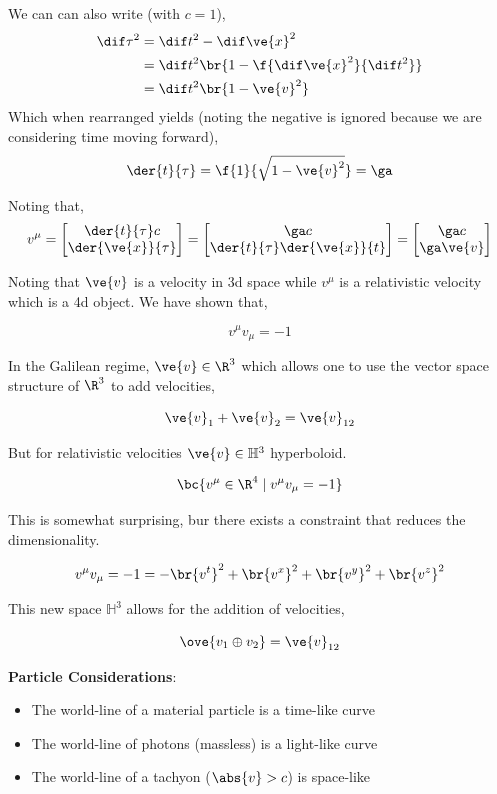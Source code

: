 \documentclass{article}
\newcommand{\mtrx}[1]{
    \begin{bmatrix}
    #1
    \end{bmatrix}
}
\newcommand{\heading}[1]{\vspace{0.1in}\textbf{#1}:}
\begin{document}
We can can also write (with $c=1$),
\begin{align*}
\dif \tau^2 &= \dif t^2 - \dif \ve{x}^2 \\
&= \dif t^2\br{1 - \f{\dif \ve{x}^2}{\dif t^2}} \\
&= \dif t^2\br{1 - \ve{v}^2} \\
\end{align*}
Which when rearranged yields (noting the negative is ignored because we are considering time moving forward),
\[ \der{t}{\tau} = \f{1}{\sqrt{1-\ve{v}^2}} = \ga \]

Noting that,
\[ v^\mu = \mtrx{\der{t}{\tau} c \\ \der{\ve{x}}{\tau}} = \mtrx{\ga c \\ \der{t}{\tau}\der{\ve{x}}{t}} = \mtrx{\ga c \\ \ga\ve{v}} \]

Noting that $\ve{v}$ is a velocity in 3d space while $v^\mu$ is a relativistic velocity which is a 4d object. We have shown that,

\[ v^\mu v_\mu = -1 \]

In the Galilean regime, $\ve{v} \in \R^3$ which allows one to use the vector space structure of $\R^3$ to add velocities,

\[ \ve{v}_1 + \ve{v}_2 = \ve{v}_{12}\]

But for relativistic velocities $\ve{v} \in \mathbb{H}^3$ hyperboloid.

\[ \bc{v^\mu \in \R^4 \mid v^\mu v_\mu = -1} \]

This is somewhat surprising, bur there exists a constraint that reduces the dimensionality.

\[ v^\mu v_\mu = -1 = - \br{v^t}^2 + \br{v^x}^2 + \br{v^y}^2 + \br{v^z}^2 \]

\begin{center}
\end{center}

This new space $\mathbb{H}^3$ allows for the addition of velocities,

\[ \ove{v_1 \oplus v_2} = \ve{v}_{12} \]

\heading{Particle Considerations}

\begin{itemize}
    \item The world-line of a material particle is a time-like curve
    \item The world-line of photons (massless) is a light-like curve
    \item The world-line of a tachyon ($\abs{v} > c$) is space-like
\end{itemize}
\end{document}
